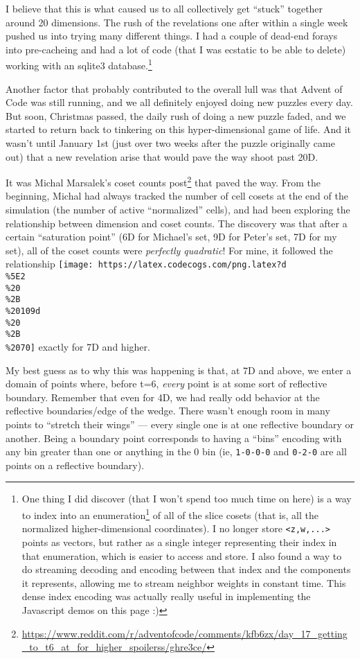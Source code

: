 \documentclass[]{article}
\renewcommand{\href}[2]{#2\footnote{\url{#1}}}
\begin{document}
I believe that this is what caused us to all collectively get ``stuck'' together
around 20 dimensions. The rush of the revelations one after within a single week
pushed us into trying many different things. I had a couple of dead-end forays
into pre-cacheing and had a lot of code (that I was ecstatic to be able to
delete) working with an sqlite3 database.\footnote{One thing I did discover
  (that I won't spend too much time on here) is a way to
  \href{https://www.reddit.com/r/adventofcode/comments/kfb6zx/day_17_getting_to_t6_at_for_higher_spoilerss/gim68l0/}{index
  into an enumeration} of all of the slice cosets (that is, all the normalized
  higher-dimensional coordinates). I no longer store
  \texttt{\textless{}z,w,...\textgreater{}} points as vectors, but rather as a
  single integer representing their index in that enumeration, which is easier
  to access and store. I also found a way to do streaming decoding and encoding
  between that index and the components it represents, allowing me to stream
  neighbor weights in constant time. This dense index encoding was actually
  really useful in implementing the Javascript demos on this page :)}

Another factor that probably contributed to the overall lull was that Advent of
Code was still running, and we all definitely enjoyed doing new puzzles every
day. But soon, Christmas passed, the daily rush of doing a new puzzle faded, and
we started to return back to tinkering on this hyper-dimensional game of life.
And it wasn't until January 1st (just over two weeks after the puzzle originally
came out) that a new revelation arise that would pave the way shoot past 20D.

It was
\href{https://www.reddit.com/r/adventofcode/comments/kfb6zx/day_17_getting_to_t6_at_for_higher_spoilerss/ghre3ce/}{Michal
Marsalek's coset counts post} that paved the way. From the beginning, Michal had
always tracked the number of cell cosets at the end of the simulation (the
number of active ``normalized'' cells), and had been exploring the relationship
between dimension and coset counts. The discovery was that after a certain
``saturation point'' (6D for Michael's set, 9D for Peter's set, 7D for my set),
all of the coset counts were \emph{perfectly quadratic}! For mine, it followed
the relationship
\texttt{[image: https://latex.codecogs.com/png.latex?d\\\%5E2\\\%20\\\%2B\\\%20109d\\\%20\\\%2B\\\%2070]}
exactly for 7D and higher.

My best guess as to why this was happening is that, at 7D and above, we enter a
domain of points where, before t=6, \emph{every} point is at some sort of
reflective boundary. Remember that even for 4D, we had really odd behavior at
the reflective boundaries/edge of the wedge. There wasn't enough room in many
points to ``stretch their wings'' --- every single one is at one reflective
boundary or another. Being a boundary point corresponds to having a ``bins''
encoding with any bin greater than one or anything in the 0 bin (ie,
\texttt{1-0-0-0} and \texttt{0-2-0} are all points on a reflective boundary).
\end{document}
